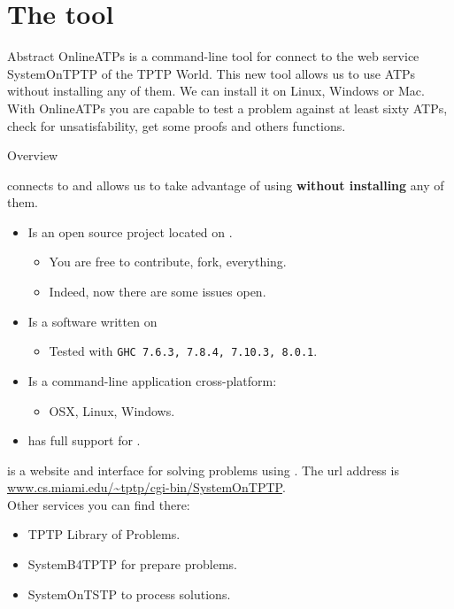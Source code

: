 \documentclass[newPxFont]{beamer}
\begin{document}
\maketitle

% 


\section{The tool}

\begin{frame}{Abstract}
OnlineATPs is a command-line tool for connect to the web service SystemOnTPTP of the TPTP World.
This new tool allows us to use ATPs without installing any of them. We can install it on Linux, Windows or Mac.
With OnlineATPs you are capable to test a problem against at least sixty ATPs, check for unsatisfability, get some proofs and others functions.
\end{frame}

\begin{frame}{Overview}

\onlineatps connects to \alert{\systemontptp} and allows us to take
advantage of using \alert{\atps} \textbf{without installing} any of them.
\begin{itemize}
\item Is an open source project located on .
\begin{itemize}
  \item You are free to contribute, fork, everything.
  \item Indeed, now there are some issues open.
  \end{itemize}
\item Is a software written on 
\begin{itemize}
  \item Tested with \texttt{GHC 7.6.3, 7.8.4, 7.10.3, 8.0.1}.
  \end{itemize}
\item Is a command-line application cross-platform:
\begin{itemize}
  \item OSX, Linux, Windows.
\end{itemize}
\item \apia has full support for \onlineatps.
\end{itemize}
\end{frame}

\begin{frame}
\systemontptp is a website and interface for solving problems using \atps.
The url address is \url{www.cs.miami.edu/~tptp/cgi-bin/SystemOnTPTP}.\\
Other services you can find there:
\begin{itemize}
\item TPTP Library of Problems.
\item SystemB4TPTP for prepare problems.
\item SystemOnTSTP to process solutions.
\end{itemize}
\end{frame}
\end{document}
